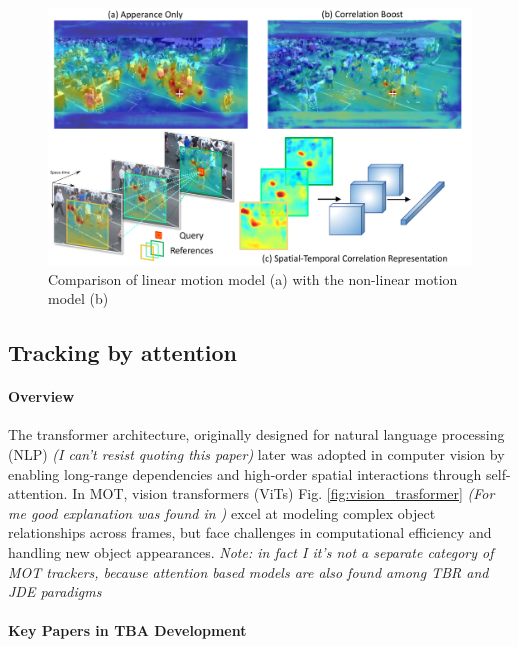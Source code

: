 \documentclass[12pt, a4paper]{article}
\begin{document}
\begin{figure}[h]
    \centering
    \includegraphics[width=0.8\linewidth]{pictures/CorrTrack.pdf}
    \caption{Comparison of linear motion model (a) with the non-linear motion model (b)}
    \label{fig:Corrtrack}
\end{figure}


\subsection{Tracking by attention}
\label{sec:Tracking_by_attention_TBA}

\paragraph{Overview}
The transformer architecture, originally designed for natural language processing (NLP) \cite{early_attention, attention-is-all-you-need} \textit{(I can't resist quoting this paper)} later was adopted in computer vision by enabling long-range dependencies and high-order spatial interactions through self-attention. In MOT, vision transformers (ViTs) Fig. \ref{fig:vision_trasformer} \textit{(For me good explanation was found in \cite{ViT-survey, ViT-how-works})} excel at modeling complex object relationships across frames, but face challenges in computational efficiency and handling new object appearances. \textit{Note: in fact I it's not a separate category of MOT trackers, because attention based models are also found among TBR and JDE paradigms}

\paragraph{Key Papers in TBA Development}
\emph{}
\end{document}

